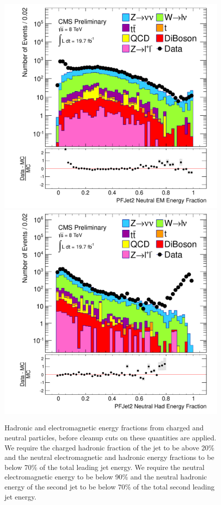 \begin{figure}[!Hhtb]
\begin{center}
  \includegraphics[scale=0.31]     {Figures/sus13009/nocut/prelimLabels/PFAK5JetNeuEmEngFrac2.pdf}
  \includegraphics[scale=0.31]     {Figures/sus13009/nocut/prelimLabels/PFAK5JetNeuHadEngFrac2.pdf}
  \caption{Hadronic and electromagnetic energy fractions from charged 
and neutral particles, before cleanup cuts on these quantities are 
applied.  We require the charged 
hadronic fraction of the jet to be above 20\% and the neutral electromagnetic and hadronic energy fractions to be below 70\% of the total leading jet energy.
We require the neutral electromagnetic energy to be below 90\% and the neutral hadronic energy of the second jet to be below 70\% of the total second leading jet energy. }
         \label{fig:ANA_energy_fraction_cleanup}
  \end{center}
\end{figure}
